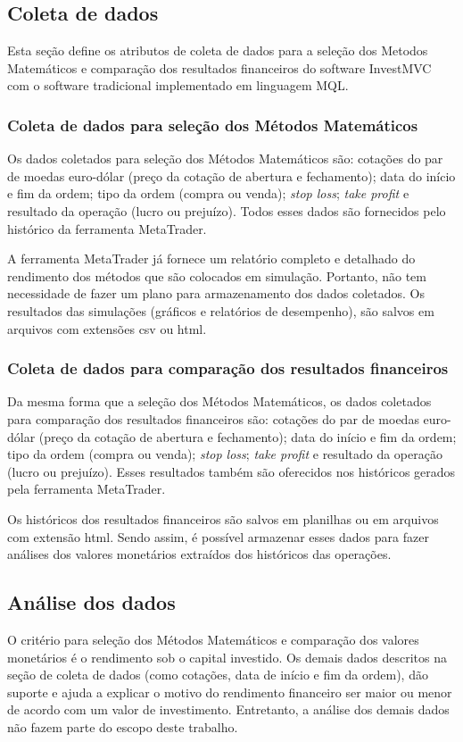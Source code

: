 \subsection{Coleta de dados}
Esta seção define os atributos de coleta de dados para a seleção dos Metodos Matemáticos e comparação dos resultados financeiros do software InvestMVC com o software tradicional implementado em linguagem MQL.

\subsubsection{Coleta de dados para seleção dos Métodos Matemáticos}
Os dados coletados para seleção dos Métodos Matemáticos são: cotações do par de moedas euro-dólar (preço da cotação de abertura e fechamento); data do início e fim da ordem; tipo da ordem (compra ou venda); \textit{stop loss}; \textit{take profit} e resultado da operação (lucro ou prejuízo). Todos esses dados são fornecidos pelo histórico da ferramenta MetaTrader.

A ferramenta MetaTrader já fornece um relatório completo e detalhado do rendimento dos métodos que são colocados em simulação. Portanto, não tem necessidade de fazer um plano para armazenamento dos dados coletados. Os resultados das simulações (gráficos e relatórios de desempenho), são salvos em arquivos com extensões csv ou html.

\subsubsection{Coleta de dados para comparação dos resultados financeiros}
Da mesma forma que a seleção dos Métodos Matemáticos, os dados coletados para comparação dos resultados financeiros são: cotações do par de moedas euro-dólar (preço da cotação de abertura e fechamento); data do início e fim da ordem; tipo da ordem (compra ou venda); \textit{stop loss}; \textit{take profit} e resultado da operação (lucro ou prejuízo). Esses resultados também são oferecidos nos históricos gerados pela ferramenta MetaTrader.

Os históricos dos resultados financeiros são salvos em planilhas ou em arquivos com extensão html. Sendo assim, é possível armazenar esses dados para fazer análises dos valores monetários extraídos dos históricos das operações.

\subsection{Análise dos dados}
O critério para seleção dos Métodos Matemáticos e comparação dos valores monetários é o rendimento sob o capital investido. Os demais dados descritos na seção de coleta de dados (como cotações, data de início e fim da ordem), dão suporte e ajuda a explicar o motivo do rendimento financeiro ser maior ou menor de acordo com um valor de investimento. Entretanto, a análise dos demais dados não fazem parte do escopo deste trabalho.

